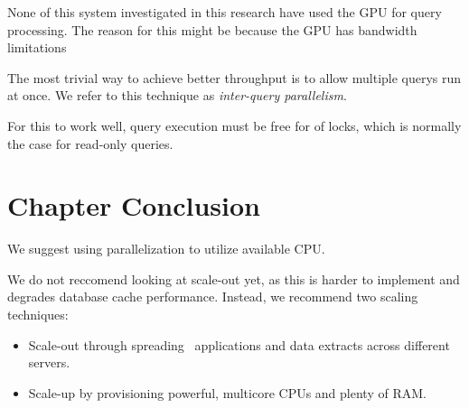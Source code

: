 None of this system investigated in this research have used the GPU for query processing. The reason for this might be because the GPU has bandwidth limitations \cite{Willhalm2009-hu} 

The most trivial way to achieve better throughput is to allow multiple querys run at once. We refer to this technique as \textit{inter-query parallelism}.

For this to work well, query execution must be free for of locks, which is normally the case for read-only queries.

\section{Chapter Conclusion}
\label{sec:Chapter Conclusion}
We suggest using parallelization to utilize available CPU. 

We do not reccomend looking at scale-out yet, as this is harder to implement and degrades database cache performance. Instead, we recommend two scaling techniques:
\begin{itemize}
  \item Scale-out through spreading \bd~applications and data extracts across different servers.
  \item Scale-up by provisioning powerful, multicore CPUs and plenty of RAM.
\end{itemize}
